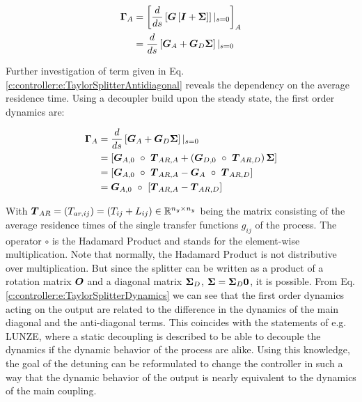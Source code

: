 \begin{align}
\begin{split}
\mbox{\boldmath$\Gamma$}_A &= \left[\frac{d}{ds}\left[ \mbox{\boldmath$G$} \left[ \mbox{\boldmath$I$} + \mbox{\boldmath$\Sigma$} \right] \right]|_{s=0}\right]_A\\
&= \frac{d}{ds}\left[ \mbox{\boldmath$G$}_A + \mbox{\boldmath$G$}_D \mbox{\boldmath$\Sigma$} \right]|_{s=0}
\end{split}
\label{c:controller:e:TaylorSplitterAntidiagonal}
\end{align}

Further investigation of term given in Eq. \ref{c:controller:e:TaylorSplitterAntidiagonal} reveals the dependency on the average residence time. Using a decoupler build upon the steady state, the first order dynamics are:

\begin{align}
\begin{split}
\mbox{\boldmath$\Gamma$}_A &= \frac{d}{ds}\left[ \mbox{\boldmath$G$}_A + \mbox{\boldmath$G$}_D \mbox{\boldmath$\Sigma$} \right]|_{s=0} \\
&= \left[ \mbox{\boldmath$G$}_{A,0}~\circ~\mbox{\boldmath$T$}_{AR,A} + \left(\mbox{\boldmath$G$}_{D,0}~\circ~\mbox{\boldmath$T$}_{AR,D} \right) \mbox{\boldmath$\Sigma$} \right] \\
&= \left[ \mbox{\boldmath$G$}_{A,0}~\circ~\mbox{\boldmath$T$}_{AR,A} - \mbox{\boldmath$G$}_A~\circ~\mbox{\boldmath$T$}_{AR,D}  \right] \\
&= \mbox{\boldmath$G$}_{A,0}~\circ~\left[ \mbox{\boldmath$T$}_{AR,A} - \mbox{\boldmath$T$}_{AR,D}\right]
\end{split}
\label{c:controller:e:TaylorSplitterDynamics}
\end{align}

With $\mbox{\boldmath$T$}_{AR} = (T_{ar,ij}) = (T_{ij} + L_{ij})\in \mathbb{R}^{n_y \times n_y}$ being the matrix consisting of the average residence times of the single transfer functions $g_{ij}$ of the process. The operator $\circ$ is the Hadamard Product and stands for the element-wise multiplication. Note that normally, the Hadamard Product is not distributive over multiplication. But since the splitter can be written as a product of a rotation matrix $\mbox{\boldmath$O$}$ and a diagonal matrix $\mbox{\boldmath$\Sigma$}_D$, $\mbox{\boldmath$\Sigma$} = \mbox{\boldmath$\Sigma$}_D \mbox{\boldmath$0$} $, it is possible. From Eq. \ref{c:controller:e:TaylorSplitterDynamics} we can see that the first order dynamics acting on the output are related to the difference in the dynamics of the main diagonal and the anti-diagonal terms. This coincides with the statements of e.g. LUNZE, where a static decoupling is described to be able to decouple the dynamics if the dynamic behavior of the process are alike. Using this knowledge, the goal of the detuning can be reformulated to change the controller in such a way that the dynamic behavior of the output is nearly equivalent to the dynamics of the main coupling. \\

